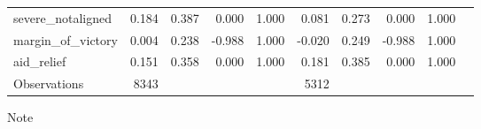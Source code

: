 \begin{table}[H]
{\begin{threeparttable}
\begin{tabular}{l*{9}{r}}
severe\_notaligned   &       0.184&       0.387&       0.000&       1.000&       0.081&       0.273&       0.000&       1.000\\
margin\_of\_victory   &       0.004&       0.238&      -0.988&       1.000&      -0.020&       0.249&      -0.988&       1.000\\
aid\_relief          &       0.151&       0.358&       0.000&       1.000&       0.181&       0.385&       0.000&       1.000\\
\hline
Observations        &        8343&            &            &            &        5312&            &            &            \\
\bottomrule
\end{tabular}
\begin{tablenotes}
\item \scriptsize{Note}
\end{tablenotes}
\end{threeparttable}
}
\end{table}
